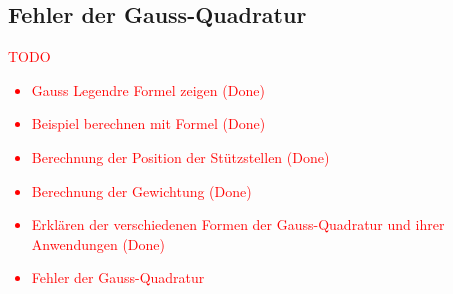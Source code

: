 \newpage

\subsection{Fehler der Gauss-Quadratur
\label{quadratur:subsection:gaussfehler}}



\textcolor{red}{
    TODO
    \begin{itemize}
        \item Gauss Legendre Formel zeigen (Done)
        \item Beispiel berechnen mit Formel (Done)
        \item Berechnung der Position der Stützstellen (Done)
        \item Berechnung der Gewichtung (Done)
        \item Erklären der verschiedenen Formen der Gauss-Quadratur und ihrer Anwendungen (Done)
        \item Fehler der Gauss-Quadratur
    \end{itemize}
}
